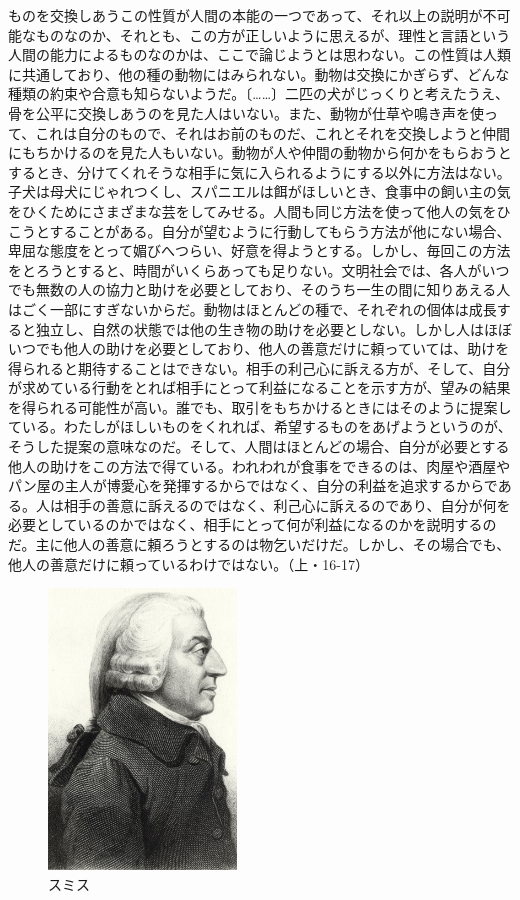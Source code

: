 ものを交換しあうこの性質が人間の本能の一つであって、それ以上の説明が不可能なものなのか、それとも、この方が正しいように思えるが、理性と言語という人間の能力によるものなのかは、ここで論じようとは思わない。この性質は人類に共通しており、他の種の動物にはみられない。動物は交換にかぎらず、どんな種類の約束や合意も知らないようだ。〔……〕二匹の犬がじっくりと考えたうえ、骨を公平に交換しあうのを見た人はいない。また、動物が仕草や鳴き声を使って、これは自分のもので、それはお前のものだ、これとそれを交換しようと仲間にもちかけるのを見た人もいない。動物が人や仲間の動物から何かをもらおうとするとき、分けてくれそうな相手に気に入られるようにする以外に方法はない。子犬は母犬にじゃれつくし、スパニエルは餌がほしいとき、食事中の飼い主の気をひくためにさまざまな芸をしてみせる。人間も同じ方法を使って他人の気をひこうとすることがある。自分が望むように行動してもらう方法が他にない場合、卑屈な態度をとって媚びへつらい、好意を得ようとする。しかし、毎回この方法をとろうとすると、時間がいくらあっても足りない。文明社会では、各人がいつでも無数の人の協力と助けを必要としており、そのうち一生の間に知りあえる人はごく一部にすぎないからだ。動物はほとんどの種で、それぞれの個体は成長すると独立し、自然の状態では他の生き物の助けを必要としない。しかし人はほぼいつでも他人の助けを必要としており、他人の善意だけに頼っていては、助けを得られると期待することはできない。相手の利己心に訴える方が、そして、自分が求めている行動をとれば相手にとって利益になることを示す方が、望みの結果を得られる可能性が高い。誰でも、取引をもちかけるときにはそのように提案している。わたしがほしいものをくれれば、希望するものをあげようというのが、そうした提案の意味なのだ。そして、人間はほとんどの場合、自分が必要とする他人の助けをこの方法で得ている。われわれが食事をできるのは、肉屋や酒屋やパン屋の主人が博愛心を発揮するからではなく、自分の利益を追求するからである。人は相手の善意に訴えるのではなく、利己心に訴えるのであり、自分が何を必要としているのかではなく、相手にとって何が利益になるのかを説明するのだ。主に他人の善意に頼ろうとするのは物乞いだけだ。しかし、その場合でも、他人の善意だけに頼っているわけではない。（上・16-17）

 \begin{figure}[htbp]
   \centering
     \includegraphics[width=50mm]{images/adamsmith.jpg}
     \caption{スミス} 
 \end{figure}


